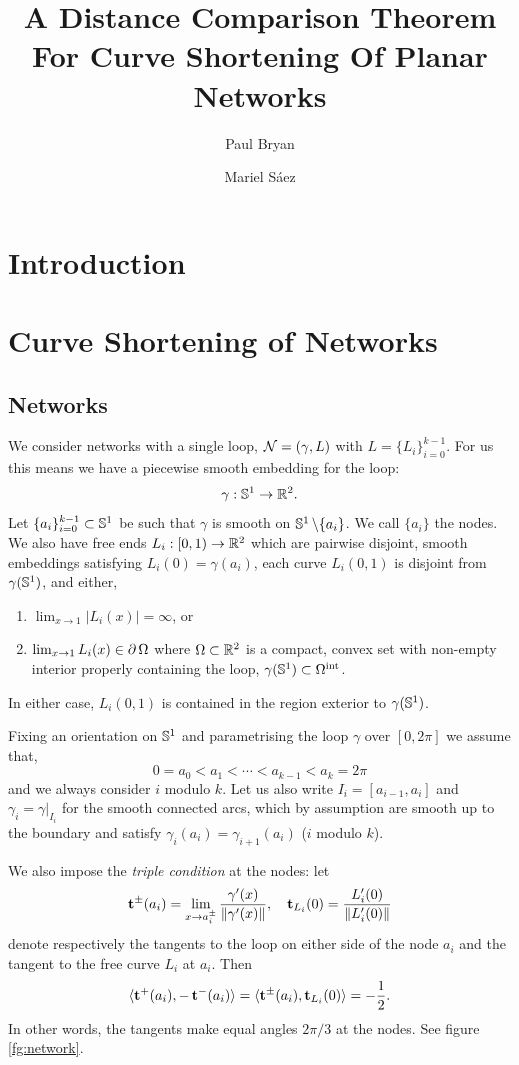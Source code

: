 \documentclass[11pt]{amsart}
\author{Paul Bryan}
\author{Mariel S\'aez}
\date{}
\title[Dist. comp. for CSF networks]{A Distance Comparison Theorem For Curve Shortening Of Planar Networks}
\begin{document}
\maketitle

\section{Introduction}
\label{sec:orgheadline1}
\section{Curve Shortening of Networks}
\label{sec:orgheadline5}

\subsection{Networks}
\label{sec:orgheadline2}

We consider networks with a single loop, \(\operatorname{\mathcal{N}} = (\gamma, L)\) with \(L = \{L_i\}_{i=0}^{k-1}\). For us this means we have a piecewise smooth embedding for the loop:
\[
\gamma : \mathbb{S}^1 \to \mathbb{R}^2.
\]
Let \(\{a_i\}_{i=0}^{k-1} \subset \mathbb{S}^{1}\) be such that \(\gamma\) is smooth on \(\mathbb{S}^1 \operatorname{\backslash} \{a_i\}\). We call \(\{a_i\}\) the nodes. We also have free ends \(L_i : [0, 1) \to \mathbb{R}^2\) which are pairwise disjoint, smooth embeddings satisfying \(L_i(0) = \gamma(a_i)\), each curve \(L_i(0, 1)\) is disjoint from \(\gamma(\mathbb{S}^1)\), and either,
\begin{enumerate}
\item \(\lim_{x\to 1} |L_i(x)| = \infty\), or
\item \(\lim_{x\to 1} L_i(x) \in \operatorname{\partial}{\Omega}\) where \(\Omega \subset \mathbb{R}^2\) is a compact, convex set with non-empty interior properly containing the loop, \(\gamma(\mathbb{S}^1) \subset {\Omega}^{\text{int}}\).
\end{enumerate}
In either case, \(L_i(0,1)\) is contained in the region exterior to \(\gamma(\mathbb{S}^1)\).

Fixing an orientation on \(\mathbb{S}^1\) and parametrising the loop \(\gamma\) over \([0, 2\pi]\) we assume that,
\[
0 = a_0 < a_1 < \cdots < a_{k-1} < a_k = 2\pi
\]
and we always consider \(i\) modulo \(k\). Let us also write \(I_i = [a_{i-1}, a_i]\) and \(\gamma_i = \gamma|_{I_i}\) for the smooth connected arcs, which by assumption are smooth up to the boundary and satisfy \(\gamma_i(a_i) = \gamma_{i+1}(a_i)\) (\(i\) modulo \(k\)).

We also impose the \emph{triple condition} at the nodes: let
\[
\operatorname{\mathbf{t}}^{\pm} (a_i) = \lim_{x\to a_i^{\pm}} \frac{\gamma'(x)}{\|\gamma'(x)\|}, \quad \operatorname{\mathbf{t}}_{L_i}(0) = \frac{L_i'(0)}{\|L_i'(0)\|}
\]
denote respectively the tangents to the loop on either side of the node \(a_i\) and the tangent to the free curve \(L_i\) at \(a_i\). Then
\begin{equation}
\label{eq:triplecondition}
\langle{\operatorname{\mathbf{t}}^+(a_i)},{-\operatorname{\mathbf{t}}^-(a_i)}\rangle = \langle{\operatorname{\mathbf{t}}^{\pm}(a_i)},{\operatorname{\mathbf{t}}_{L_i}(0)}\rangle = - \frac{1}{2}.
\end{equation}
In other words, the tangents make equal angles \(2\pi/3\) at the nodes. See figure \ref{fg:network}.
\end{document}
